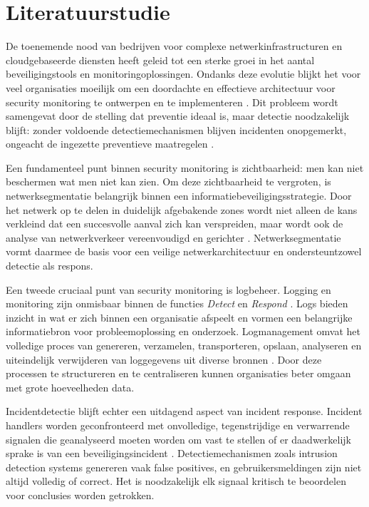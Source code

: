 \section{Literatuurstudie}%
\label{sec:literatuurstudie}
De toenemende nood van bedrijven voor complexe netwerkinfrastructuren en cloudgebaseerde diensten heeft geleid tot een sterke groei in het aantal beveiligingstools en monitoringoplossingen.
Ondanks deze evolutie blijkt het voor veel organisaties moeilijk om een doordachte en effectieve architectuur voor security monitoring te ontwerpen en te implementeren \autocite{Obregon_2015}.
Dit probleem wordt samengevat door de stelling dat preventie ideaal is, maar detectie noodzakelijk blijft: zonder voldoende detectiemechanismen blijven incidenten onopgemerkt, 
ongeacht de ingezette preventieve maatregelen \autocite{Obregon_2015}.

Een fundamenteel punt binnen security monitoring is zichtbaarheid: men kan niet beschermen wat men niet kan zien. Om deze zichtbaarheid te vergroten, is netwerksegmentatie belangrijk
binnen een informatiebeveiligingsstrategie. Door het netwerk op te delen in duidelijk afgebakende zones wordt niet alleen de kans verkleind dat een succesvolle aanval zich kan verspreiden, 
maar wordt ook de analyse van netwerkverkeer vereenvoudigd en gerichter \autocite{Obregon_2015}. Netwerksegmentatie vormt daarmee de basis voor een veilige netwerkarchitectuur en ondersteuntzowel detectie als respons.

Een tweede cruciaal punt van security monitoring is logbeheer. Logging en monitoring zijn onmisbaar binnen de functies \emph{Detect} en \emph{Respond} \autocite{NIST_CSF_2018}.
Logs bieden inzicht in wat er zich binnen een organisatie afspeelt en vormen een belangrijke informatiebron voor probleemoplossing en onderzoek. Logmanagement omvat het volledige proces van genereren,
verzamelen, transporteren, opslaan, analyseren en uiteindelijk verwijderen van loggegevens uit diverse bronnen \autocite{NIST_CSF_2018}. Door deze processen te structureren en
te centraliseren kunnen organisaties beter omgaan met grote hoeveelheden data.

Incidentdetectie blijft echter een uitdagend aspect van incident response. Incident handlers worden geconfronteerd met onvolledige, tegenstrijdige en verwarrende signalen die 
geanalyseerd moeten worden om vast te stellen of er daadwerkelijk sprake is van een beveiligingsincident \autocite{nist80061r3}. Detectiemechanismen zoals intrusion detection 
systems genereren vaak false positives, en gebruikersmeldingen zijn niet altijd volledig of correct. Het is noodzakelijk elk signaal kritisch te beoordelen voor conclusies worden getrokken.

